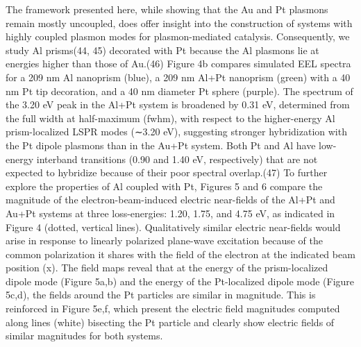 \documentclass [11pt, proquest] {uwthesis}[2016/11/22]
\begin{document}
The framework presented here, while showing that the Au and Pt plasmons remain mostly uncoupled, does offer insight into the construction of systems with highly coupled plasmon modes for plasmon-mediated catalysis. Consequently, we study Al prisms(44, 45) decorated with Pt because the Al plasmons lie at energies higher than those of Au.(46) Figure 4b compares simulated EEL spectra for a 209 nm Al nanoprism (blue), a 209 nm Al+Pt nanoprism (green) with a 40 nm Pt tip decoration, and a 40 nm diameter Pt sphere (purple). The spectrum of the 3.20 eV peak in the Al+Pt system is broadened by 0.31 eV, determined from the full width at half-maximum (fwhm), with respect to the higher-energy Al prism-localized LSPR modes (∼3.20 eV), suggesting stronger hybridization with the Pt dipole plasmons than in the Au+Pt system. Both Pt and Al have low-energy interband transitions (0.90 and 1.40 eV, respectively) that are not expected to hybridize because of their poor spectral overlap.(47)
To further explore the properties of Al coupled with Pt, Figures 5 and 6 compare the magnitude of the electron-beam-induced electric near-fields of the Al+Pt and Au+Pt systems at three loss-energies: 1.20, 1.75, and 4.75 eV, as indicated in Figure 4 (dotted, vertical lines). Qualitatively similar electric near-fields would arise in response to linearly polarized plane-wave excitation because of the common polarization it shares with the field of the electron at the indicated beam position (x). The field maps reveal that at the energy of the prism-localized dipole mode (Figure 5a,b) and the energy of the Pt-localized dipole mode (Figure 5c,d), the fields around the Pt particles are similar in magnitude. This is reinforced in Figure 5e,f, which present the electric field magnitudes computed along lines (white) bisecting the Pt particle and clearly show electric fields of similar magnitudes for both systems.
\end{document}
